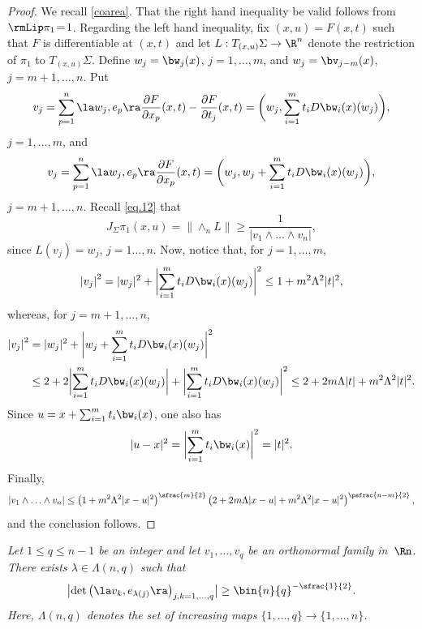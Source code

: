 \begin{proof}
We recall \ref{coarea}.
That the right hand inequality be valid follows from~\hbox{$\rmLip \pi_1 \!=\! 1$}.
Regarding the left hand inequality, fix $(x,u) = F(x,t)$ such that $F$ is differentiable at $(x,t)$ and let $L: T_{(x,u)}\Sigma \to \R^n$ denote the restriction of $\pi_1$ to $T_{(x,u)}\Sigma$.
Define $w_j = \bw_j(x)$, $j=1,\ldots,m$, and $w_j = \bv_{j-m}(x)$, $j=m+1,\ldots,n$.
Put
\begin{equation*}
v_j = \sum_{p=1}^n \la w_j,e_p \ra\frac{\partial F}{\partial x_p}(x,t) - \frac{\partial F}{\partial t_j}(x,t) = \biggl(w_j,\sum_{i=1}^m t_i D\bw_i(x)(w_j) \biggr),
\end{equation*}
$j=1,\ldots,m$, and
\begin{equation*}
v_j = \sum_{p=1}^n \la w_j,e_p \ra\frac{\partial F}{\partial x_p}(x,t) = \biggl(w_j, w_j +\sum_{i=1}^m t_i D\bw_i(x)(w_j) \biggr),
\end{equation*}
$j=m+1,\ldots,n$.
Recall \eqref{eq.12} that
\begin{equation*}
J_\Sigma \pi_1(x,u) = \|{\wedge}_n L \| \geq \frac{1}{|v_1 \wedge \ldots \wedge v_n|},
\end{equation*}
since $L(v_j)=w_j$, $j=1\ldots,n$.
Now, notice that, for $j=1,\ldots,m$,
\begin{equation*}
\left| v_j\right|^2 = |w_j|^2 + \biggl| \sum_{i=1}^m t_i D \bw_i(x)(w_j)\biggr|^2
\leq 1 + m^2\Lambda^2|t|^2,
\end{equation*}
whereas, for $j=m+1,\ldots,n$,
\begin{align*}
\left| v_j \right|^2 &= |w_j|^2 + \biggl| w_j + \sum_{i=1}^m t_i D \bw_i(x)(w_j)\biggr|^2\\
&\leq 2 + 2 \biggl|\sum_{i=1}^m t_i D \bw_i(x)(w_j) \biggr| + \biggl|\sum_{i=1}^m t_i D \bw_i(x)(w_j) \biggr|^2
\leq 2 + 2 m \Lambda |t| + m^2\Lambda^2|t|^2.
\end{align*}
Since $u = x + \sum_{i=1}^m t_i \bw_i(x)$, one also has
\begin{equation*}
|u-x|^2 = \biggl| \sum_{i=1}^m t_i \bw_i(x) \biggr|^2 = |t|^2.
\end{equation*}
Finally,
\[
|v_1 \wedge \ldots \wedge v_n |
\leq \left(1 + m^2 \Lambda^2 |x-u|^2 \right)^{\sfrac{m}{2}}\left(2 + 2 m \Lambda |x-u| + m^2\Lambda^2|x-u|^2 \right)^{\psfrac{n-m}{2}},
\]
and the conclusion follows.
\end{proof}

\begin{Empty}[]
\label{34}
{\it
Let $1 \leq q \leq n-1$ be an integer and let $v_1,\ldots,v_q$ be an orthonormal family in~$\Rn$. There exists $\lambda \in \Lambda(n,q)$ such that
\begin{equation*}
\bigl| \det \left(\la v_k, e_{\lambda(j)} \ra \right)_{j,k=1,\ldots,q}\bigr| \geq \bin{n}{q}^{-\sfrac{1}{2}}.
\end{equation*}
Here, $\Lambda(n,q)$ denotes the set of increasing maps $\{1,\ldots,q\} \to \{1,\ldots,n\}$.
}
\end{Empty}


